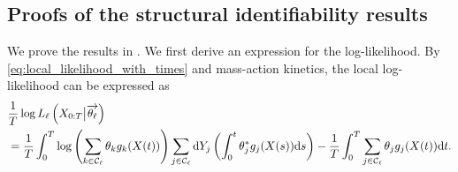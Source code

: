 \documentclass[pdflatex,sn-mathphys-num]{sn-jnl}%
\def\dd{\text{d}}
\theoremstyle{thmstyleone}%
\theoremstyle{thmstyletwo}%
\theoremstyle{thmstylethree}%
\begin{document}
\begin{appendices}

\renewcommand{\theHequation}{\thesection.\arabic{equation}}

\section{Proofs of the structural identifiability results}\label{Appendix section proofs of structural identifiability.}

We prove the results in .
We first derive an expression for the log-likelihood.
By \eqref{eq:local_likelihood_with_times} and mass-action kinetics, the local log-likelihood can be expressed as 
\begin{align}\label{eq. express log-likelihood using Y} 
        &\frac{1}{T} \log L_\ell\left(X_{0:T}\big|\overrightarrow{\theta_\ell}\right) 
        \\
        &= \frac{1}{T}\int_{0}^T \log\left(\sum_{k\in\mathcal C_\ell} \theta_k g_k(X(t))\right) \sum_{j\in\mathcal C_\ell} \dd Y_j\left(\int_0^t \theta^*_j g_j(X(s)) \dd s\right)
        - 
        \frac{1}{T}\int_{0}^T \sum_{j\in\mathcal C_\ell} \theta_j g_j(X(t)) \dd t. \notag
\end{align}



\end{appendices}
\end{document}

